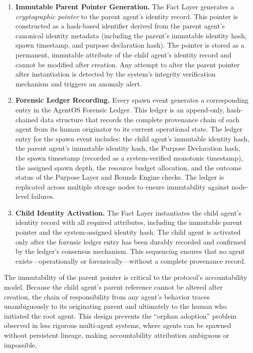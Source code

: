 \begin{enumerate}
\item \textbf{Immutable Parent Pointer Generation.} The Fact Layer generates a \emph{cryptographic pointer} to the parent agent's identity record. This pointer is constructed as a hash-based identifier derived from the parent agent's canonical identity metadata (including the parent's immutable identity hash, spawn timestamp, and purpose declaration hash). The pointer is stored as a permanent, immutable attribute of the child agent's identity record and cannot be modified after creation. Any attempt to alter the parent pointer after instantiation is detected by the system's integrity verification mechanism and triggers an anomaly alert.

\item \textbf{Forensic Ledger Recording.} Every spawn event generates a corresponding entry in the AgentOS Forensic Ledger. This ledger is an append-only, hash-chained data structure that records the complete provenance chain of each agent from its human originator to its current operational state. The ledger entry for the spawn event includes: the child agent's immutable identity hash, the parent agent's immutable identity hash, the Purpose Declaration hash, the spawn timestamp (recorded as a system-verified monotonic timestamp), the assigned spawn depth, the resource budget allocation, and the outcome status of the Purpose Layer and Bounds Engine checks. The ledger is replicated across multiple storage nodes to ensure immutability against node-level failures.

\item \textbf{Child Identity Activation.} The Fact Layer instantiates the child agent's identity record with all required attributes, including the immutable parent pointer and the system-assigned identity hash. The child agent is activated only after the forensic ledger entry has been durably recorded and confirmed by the ledger's consensus mechanism. This sequencing ensures that no agent exists—operationally or forensically—without a complete provenance record.
\end{enumerate}

The immutability of the parent pointer is critical to the protocol's accountability model. Because the child agent's parent reference cannot be altered after creation, the chain of responsibility from any agent's behavior traces unambiguously to its originating parent and ultimately to the human who initiated the root agent. This design prevents the ``orphan adoption'' problem observed in less rigorous multi-agent systems, where agents can be spawned without persistent lineage, making accountability attribution ambiguous or impossible.

